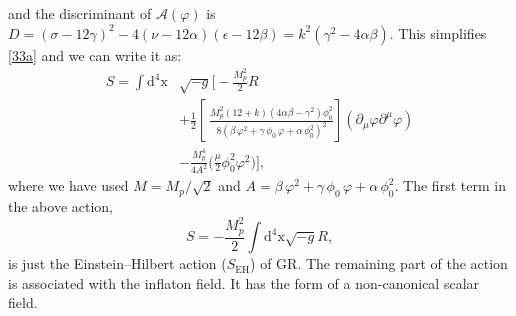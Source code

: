 \documentclass[aps,prd,reprint,preprintnumbers,showpacs,floatfix,nofootinbib,superscript address]{revtex4-2}
\newcommand{\wb}[1]{{\color[RGB]{255,0,0}{\textbf{\textit{[WB: #1]}}}}}
\begin{document}

and the discriminant of $\mathcal{A}(\varphi)$ is $D = (\sigma -12 \gamma )^2-4 (\nu -12 \alpha ) (\epsilon -12 \beta ) = k^2 (\gamma^2 - 4\alpha \beta)$. This simplifies \cref{33a} and we can write it as:
\begin{equation}
    \begin{aligned}
          S = \int \text{d}^4\text{x} &\sqrt{-g} \Bigg[- \frac{M_p^2}{2}R \\ &+ \frac{1}{2} \left[\ \frac{M_p^2(12+k)(4\alpha\beta-\gamma^2) \phi_0^2}{8(\beta\,\varphi^2 + \gamma\,\phi_0\,\varphi + \alpha\,\phi_0^2)^2} \right] (\partial_\mu \varphi \partial^\mu \varphi) \\ &-  \frac{M_p^4}{4A^2} \bigg( \frac{\mu}{2} \phi^2_0 \varphi^2 \bigg) \Bigg],
    \end{aligned}
\end{equation}
where we have used $M=M_p/\sqrt{2} $ and $A =\beta\,\varphi^2 + \gamma\,\phi_0\,\varphi + \alpha\,\phi_0^2$. The first term in the above action, \[S = - \frac{M_p^2}{2}\int \text{d}^4\text{x} \sqrt{-g} R,\] is just the Einstein--Hilbert action ($S_\text{EH}$) of GR. The remaining part of the action is associated with the inflaton field. It has the form of a non-canonical scalar field.
\end{document}
